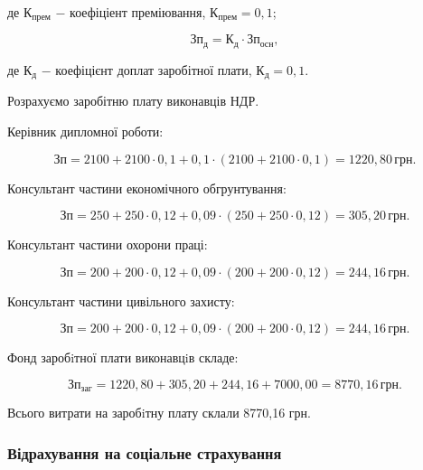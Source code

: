 \noindent де $\text{К}_{\text{прем}}$ $-$ коефіціент преміювання, $\text{К}_{\text{прем}} = 0,1$;

\begin{equation}
\text{Зп}_{\text{д}} = \text{К}_{\text{д}} \cdot \text{Зп}_{\text{осн}},
\end{equation}

\noindent де $\text{К}_{\text{д}}$ $-$ коефіцієнт доплат заробітної плати, $\text{К}_{\text{д}} = 0,1$. 

\vspace{1.5em}

Розрахуємо заробітню плату виконавців НДР.

Керівник дипломної роботи:

\[
\text{Зп} = 2100 + 2100 \cdot 0,1 + 0,1 \cdot (2100 + 2100 \cdot 0,1) = 1220,80 \, \text{грн}.
\]

\vspace{1.5em}

Консультант частини економічного обгрунтування:

\[
\text{Зп} = 250 + 250 \cdot 0,12 + 0,09 \cdot (250 + 250 \cdot 0,12) = 305,20 \, \text{грн}.
\]

\vspace{1.5em}

Консультант частини охорони праці:

\[
\text{Зп} = 200 + 200 \cdot 0,12 + 0,09 \cdot (200 + 200 \cdot 0,12) = 244,16 \, \text{грн}.
\]

\vspace{1.5em}

Консультант частини цивільного захисту:

\[
\text{Зп} = 200 + 200 \cdot 0,12 + 0,09 \cdot (200 + 200 \cdot 0,12) = 244,16 \, \text{грн}.
\]

\vspace{1.5em}

Фонд заробiтної плати виконавцiв складе:

\[
\text{Зп}_{\text{заг}} = 1220,80 + 305,20 + 244,16 + 7000,00 = 8770,16 \, \text{грн}.
\]

\vspace{1.5em}

Всього витрати на заробiтну плату склали 8770,16 грн.

\subsubsection{Відрахування на соціальне страхування}

